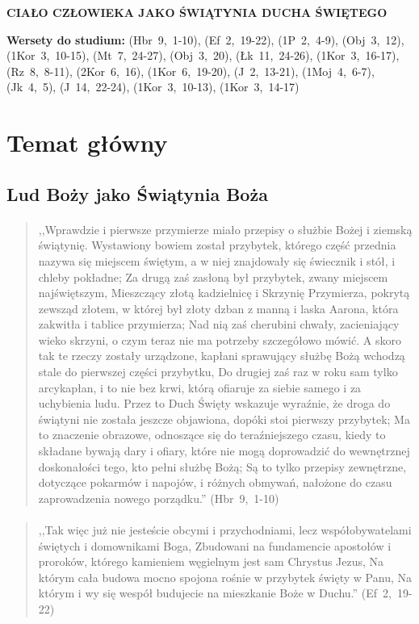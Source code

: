 \documentclass[10pt,a4paper,oneside]{article}
\begin{document}
\centerline{\textbf{\MakeUppercase{Ciało człowieka jako Świątynia Ducha Świętego}}}
\begin{center}
\textbf{Wersety do studium:} \mbox{(Hbr 9, 1-10)}, \mbox{(Ef 2, 19-22)}, \mbox{(1P 2, 4-9)}, \mbox{(Obj 3, 12)}, \mbox{(1Kor 3, 10-15)}, \mbox{(Mt 7, 24-27)}, \mbox{(Obj 3, 20)}, \mbox{(Łk 11, 24-26)}, \mbox{(1Kor 3, 16-17)}, \mbox{(Rz 8, 8-11)}, \mbox{(2Kor 6, 16)}, \mbox{(1Kor 6, 19-20)}, \mbox{(J 2, 13-21)}, \mbox{(1Moj 4, 6-7)}, \mbox{(Jk 4, 5)}, \mbox{(J 14, 22-24)}, \mbox{(1Kor 3, 10-13)}, \mbox{(1Kor 3, 14-17)}
\end{center}
\section{Temat główny}
\subsection{Lud Boży jako Świątynia Boża}
\paragraph{}
\begin{quote}
,,Wprawdzie i pierwsze przymierze miało przepisy o służbie Bożej i ziemską świątynię. Wystawiony bowiem został przybytek, którego część przednia nazywa się miejscem świętym, a w niej znajdowały się świecznik i stół, i chleby pokładne; Za drugą zaś zasłoną był przybytek, zwany miejscem najświętszym, Mieszczący złotą kadzielnicę i Skrzynię Przymierza, pokrytą zewsząd złotem, w której był złoty dzban z manną i laska Aarona, która zakwitła i tablice przymierza; Nad nią zaś cherubini chwały, zacieniający wieko skrzyni, o czym teraz nie ma potrzeby szczegółowo mówić. A skoro tak te rzeczy zostały urządzone, kapłani sprawujący służbę Bożą wchodzą stale do pierwszej części przybytku, Do drugiej zaś raz w roku sam tylko arcykapłan, i to nie bez krwi, którą ofiaruje za siebie samego i za uchybienia ludu. Przez to Duch Święty wskazuje wyraźnie, że droga do świątyni nie została jeszcze objawiona, dopóki stoi pierwszy przybytek; Ma to znaczenie obrazowe, odnoszące się do teraźniejszego czasu, kiedy to składane bywają dary i ofiary, które nie mogą doprowadzić do wewnętrznej doskonałości tego, kto pełni służbę Bożą; Są to tylko przepisy zewnętrzne, dotyczące pokarmów i napojów, i różnych obmywań, nałożone do czasu zaprowadzenia nowego porządku.'' \mbox{(Hbr 9, 1-10)}
\end{quote}
\paragraph{}
\begin{quote}
,,Tak więc już nie jesteście obcymi i przychodniami, lecz współobywatelami świętych i domownikami Boga, Zbudowani na fundamencie apostołów i proroków, którego kamieniem węgielnym jest sam Chrystus Jezus, Na którym cała budowa mocno spojona rośnie w przybytek święty w Panu, Na którym i wy się wespół budujecie na mieszkanie Boże w Duchu.'' \mbox{(Ef 2, 19-22)}
\end{quote}
\end{document}
